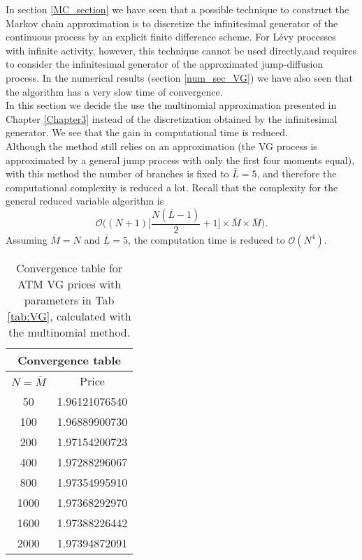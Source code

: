 In section \ref{MC_section} we have seen that a possible technique to construct the Markov chain approximation is to discretize the infinitesimal generator of the continuous process
by an explicit finite difference scheme.
For Lévy processes with infinite activity, however, this technique cannot be used directly,and requires to consider the infinitesimal generator of the approximated 
jump-diffusion process.
In the numerical results (section \ref{num_sec_VG}) we have also seen that the algorithm has a very slow time of convergence.\\
In this section we decide the use the multinomial approximation presented in Chapter \ref{Chapter3} instead of the discretization obtained by the infinitesimal generator.
We see that the gain in computational time is reduced. \\
Although the method still relies on an approximation (the VG process is approximated by a general jump process with only the first four moments equal),
with this method the number of branches is fixed to $\bar L = 5$, and therefore the computational complexity is reduced a lot.
Recall that the complexity for the general reduced variable algorithm is 
$$\mathcal{O}\biggl( (N+1)\bigl[\frac{N(\bar L-1)}{2}+1 \bigr] \times \bar M \times \bar M \biggr).$$
Assuming $\bar M = N$ and $\bar L = 5$, the computation time is reduced to $\mathcal{O}(N^4)$. 
\begin{table}[t!]
\begin{center}
\begin{minipage}{0.8\linewidth}
\centering
 \begin{tabular}{||c|c||}
 \hline
  \multicolumn{2}{|c|}{Convergence table} \\
  \hline
  $N = \bar M$ & Price \\
  \hline
    50 & 1.96121076540 \\
  \hline
    100 & 1.96889900730 \\
  \hline  
    200 &  1.97154200723 \\
  \hline
    400 & 1.97288296067 \\
  \hline   
    800 & 1.97354995910  \\
  \hline
    1000 & 1.97368292970 \\ 
  \hline
    1600 & 1.97388226442  \\
  \hline
    2000 & 1.97394872091  \\  \hline
  \end{tabular}
  \caption{Convergence table for ATM VG prices with parameters in Tab \ref{tab:VG}, calculated with the multinomial method.}
  \label{tab:convergence31}
\end{minipage}
 \end{center}
\end{table}
